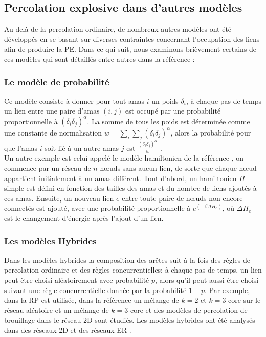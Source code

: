 \subsection{Percolation explosive dans d'autres modèles}
Au-delà de la percolation ordinaire, de nombreux autres modèles ont été développés en se basant sur diverses contraintes concernant l'occupation des liens afin de produire la PE. Dans ce qui suit, nous examinons brièvement certains de ces modèles qui sont détaillés entre autres dans la référence \cite{Boccaletti-al2016}: 
\subsubsection{Le modèle de probabilité}
Ce modèle consiste à donner pour tout amas $i$ un poids $\delta_i$, à chaque pas de temps un lien entre une paire d'amas $(i,j)$ est occupé par une probabilité proportionnelle à $(\delta_i\delta_j)^{\alpha}$. La somme  de tous les poids est déterminée comme une constante de normalisation $w=\sum_i\sum_j(\delta_i\delta_j)^{\alpha}$, alors la probabilité pour que l'amas $i$ soit lié à un autre amas $j$ est $\frac{(\delta_i\delta_j)^{\alpha}}{w}$ \cite{Cho-al2010}.\\ Un autre exemple est celui appelé le modèle hamiltonien de la référence \cite{Moreira-al2010}, on commence par un réseau de $n$ nœuds sans aucun lien, de sorte que chaque nœud appartient initialement à un amas différent. Tout d'abord, un hamiltonien $H$ simple est défini en fonction des tailles des amas et du nombre de liens ajoutés à ces amas. Ensuite, un nouveau lien $e$ entre toute paire de nœuds non encore connectés est ajouté, avec une probabilité proportionnelle à $e^{(-\beta\Delta H_e)}$, où $\Delta H_e$ est le changement d'énergie après l'ajout d'un lien.

\subsubsection{Les modèles Hybrides}
Dans les modèles hybrides la composition des arêtes suit à la fois des règles de percolation ordinaire et des règles concurrentielles: à chaque pas de temps, un lien peut être choisi aléatoirement avec probabilité $p$, alors qu'il peut aussi être choisi suivant une règle concurrentielle donnée par la probabilité $1-p$. Par exemple, dans \cite{Bastas-al2014} la RP est utilisée, dans la référence \cite{Cao-Schwarz2012} un mélange de $k=2$ et $k=3$-core sur le réseau aléatoire et un mélange de $k=3$-core et des modèles de percolation de brouillage dans le réseau 2D sont étudiés. Les modèles hybrides ont été analysés dans des réseaux 2D \cite{Cao-Schwarz2012,Bastas-al2014} et des réseaux ER  \cite{Cao-Schwarz2012,Bastas-al2014,Fan-al2012}.
